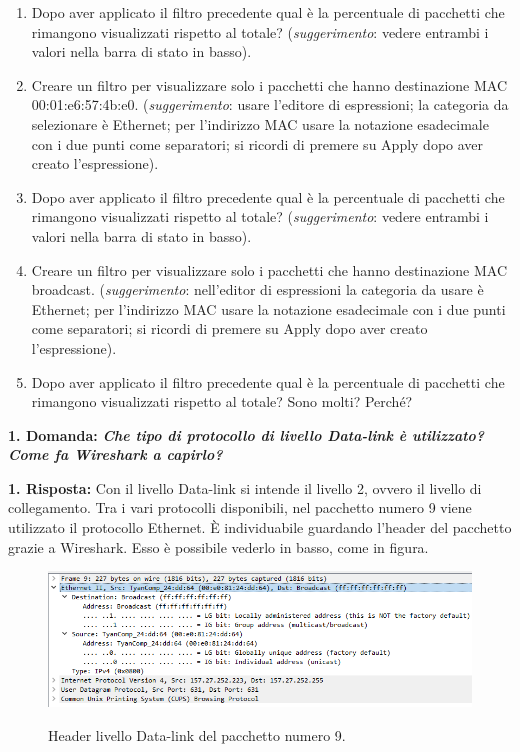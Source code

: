 \documentclass[a4paper]{article}
\begin{document}
\begin{enumerate}
		\item Dopo aver applicato il filtro precedente qual è la percentuale di pacchetti che rimangono visualizzati rispetto al totale?\newline
		(\emph{suggerimento}: vedere entrambi i valori nella barra di stato in basso).
		
		\item Creare un filtro per visualizzare solo i pacchetti che hanno destinazione MAC 00:01:e6:57:4b:e0.\newline
		(\emph{suggerimento}: usare l'editore di espressioni; la categoria da selezionare è \textsf{Ethernet}; per l'indirizzo MAC usare la notazione esadecimale con i due punti come separatori; si ricordi di premere su \textsf{Apply} dopo aver creato l'espressione).
		
		\item Dopo aver applicato il filtro precedente qual è la percentuale di pacchetti che rimangono visualizzati rispetto al totale?\newline
		(\emph{suggerimento}: vedere entrambi i valori nella barra di stato in basso).
		
		\item Creare un filtro per visualizzare solo i pacchetti che hanno destinazione MAC broadcast.\newline
		(\emph{suggerimento}: nell'editor di espressioni la categoria da usare è \textsf{Ethernet}; per l'indirizzo MAC usare la notazione esadecimale con i due punti come separatori; si ricordi di premere su \textsf{Apply} dopo aver creato l'espressione).
		
		\item Dopo aver applicato il filtro precedente qual è la percentuale di pacchetti che rimangono visualizzati rispetto al totale? Sono molti? Perché?
	\end{enumerate}\newpage
	
	\noindent
	\textcolor{Red3}{\textbf{1. Domanda:}} \textbf{\emph{Che tipo di protocollo di livello Data-link è utilizzato? Come fa Wireshark a capirlo?}}\label{come fa Wireshark a capirlo}\newline
	
	\noindent
	\textcolor{Green4}{\textbf{1. Risposta:}} Con il livello Data-link si intende il livello 2, ovvero il livello di collegamento. Tra i vari protocolli disponibili, nel pacchetto numero 9 viene utilizzato il protocollo Ethernet. È individuabile guardando l'header del pacchetto grazie a Wireshark. Esso è possibile vederlo in basso, come in figura.
	\begin{figure}[!htp]
		\centering
		\includegraphics[width=\textwidth]{img/wireshark/ex1.png}
		\label{fig:header-ex1}
		\caption{Header livello Data-link del pacchetto numero 9.}
	\end{figure}
	
\end{document}
